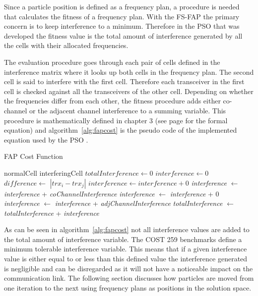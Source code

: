 Since a particle position is defined as a frequency plan, a procedure is needed that calculates the fitness of a frequency plan. With the \gls{FS-FAP} the primary concern is to keep interference to a minimum. Therefore in the \gls{PSO} that was developed the fitness value is the total amount of interference generated by all the cells with their allocated frequencies. 

The evaluation procedure goes through each pair of cells defined in the interference matrix where it looks up both cells in the frequency plan. The second cell is said to interfere with the first cell. Therefore each transceiver in the first cell is checked against all the transceivers of the other cell. Depending on whether the frequencies differ from each other, the fitness procedure adds either co-channel or the adjacent channel interference to a summing variable. This procedure is mathematically defined in chapter 3 (see page \pageref{E:costFunction} for the formal equation) and algorithm~\ref{alg:fapcost} is the pseudo code of the implemented equation used by the \gls{PSO} . 

\begin{algorithm}
\caption{FAP Cost Function}
\label{alg:fapcost}
	\begin{algorithmic}[1]
	\Require normalCell
	\Require interferingCell
	\State $totalInterference \leftarrow $0
			\State $interference \leftarrow 0$
			\State $difference \leftarrow$ $|trx_i - trx_j|$
					\State $interference \leftarrow interference + 0$
				\Else
                \State \emph{interference} $\leftarrow$ \emph{interference} + \emph{coChannelInterference}
				\EndIf
			\Else
                    \State \emph{interference} $\leftarrow$ \emph{interference} + 0
					\Else
                    \State \emph{interference} $\leftarrow$ \emph{interference} + \emph{adjChannelInterference}
					\EndIf
				\EndIf
			\EndIf
            \State \emph{totalInterference} $\leftarrow$ \emph{totalInterference} + \emph{interference}
		\EndFor
	\EndFor
	\end{algorithmic}
\end{algorithm}

As can be seen in algorithm~\ref{alg:fapcost} not all interference values are added to the total amount of interference variable. The COST 259 benchmarks define a minimum tolerable interference variable. This means that if a given interference value is either equal to or less than this defined value the interference generated is negligible and can be disregarded as it will not have a noticeable impact on the communication link. The following section discusses how particles are moved from one iteration to the next using frequency plans as positions in the solution space.
